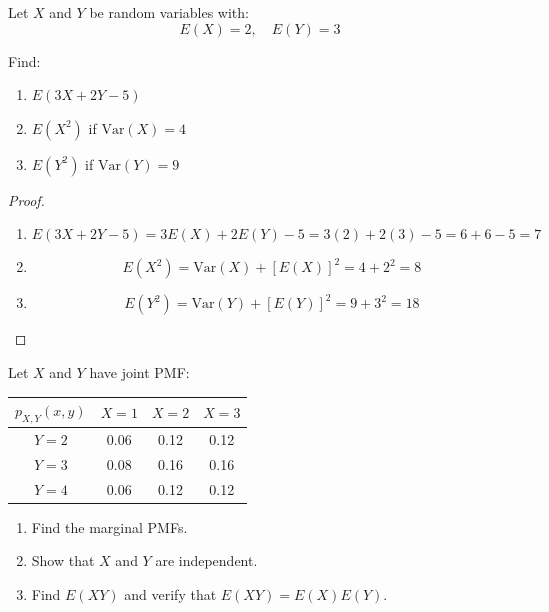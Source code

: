 \begin{exercise}
Let $X$ and $Y$ be random variables with:
\[
E(X) = 2, \quad E(Y) = 3
\]

Find:
\begin{enumerate}[label=(\alph*)]
    \item $E(3X + 2Y - 5)$
    \item $E(X^2)$ if $\text{Var}(X) = 4$
    \item $E(Y^2)$ if $\text{Var}(Y) = 9$
\end{enumerate}
\end{exercise}

\begin{proof}
\begin{enumerate}[label=(\alph*)]
    \item 
    \[
    E(3X + 2Y - 5) = 3E(X) + 2E(Y) - 5 = 3(2) + 2(3) - 5 = 6 + 6 - 5 = 7
    \]
    
    \item 
    \[
    E(X^2) = \text{Var}(X) + [E(X)]^2 = 4 + 2^2 = 8
    \]
    
    \item 
    \[
    E(Y^2) = \text{Var}(Y) + [E(Y)]^2 = 9 + 3^2 = 18
    \]
\end{enumerate}
\end{proof}

\begin{exercise}
Let $X$ and $Y$ have joint PMF:

\begin{center}
\renewcommand{\arraystretch}{1.5}
\begin{tabular}{c|ccc}
$p_{X,Y}(x,y)$ & $X=1$ & $X=2$ & $X=3$ \\ \hline
$Y=2$ & 0.06 & 0.12 & 0.12 \\
$Y=3$ & 0.08 & 0.16 & 0.16 \\
$Y=4$ & 0.06 & 0.12 & 0.12 \\
\end{tabular}
\end{center}

\begin{enumerate}[label=(\alph*)]
    \item Find the marginal PMFs.
    \item Show that $X$ and $Y$ are independent.
    \item Find $E(XY)$ and verify that $E(XY) = E(X)E(Y)$.
\end{enumerate}
\end{exercise}

